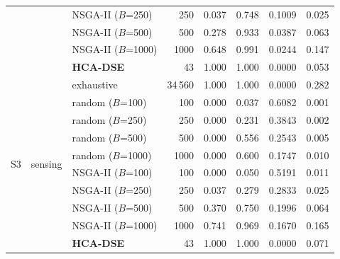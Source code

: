 \begin{tabular}{lllrrrrr}
 & & NSGA-II ($B$=250) & 250 & 0.037 & 0.748 & 0.1009 & 0.025 \\
 & & NSGA-II ($B$=500) & 500 & 0.278 & 0.933 & 0.0387 & 0.063 \\
 & & NSGA-II ($B$=1000) & 1000 & 0.648 & 0.991 & 0.0244 & 0.147 \\
 & & \textbf{HCA-DSE} & 43 & 1.000 & 1.000 & 0.0000 & 0.053 \\
\midrule
\multirow{10}{*}{S3} & \multirow{10}{*}{sensing} & exhaustive & 34\,560 & 1.000 & 1.000 & 0.0000 & 0.282 \\
 & & random ($B$=100) & 100 & 0.000 & 0.037 & 0.6082 & 0.001 \\
 & & random ($B$=250) & 250 & 0.000 & 0.231 & 0.3843 & 0.002 \\
 & & random ($B$=500) & 500 & 0.000 & 0.556 & 0.2543 & 0.005 \\
 & & random ($B$=1000) & 1000 & 0.000 & 0.600 & 0.1747 & 0.010 \\
 & & NSGA-II ($B$=100) & 100 & 0.000 & 0.050 & 0.5191 & 0.011 \\
 & & NSGA-II ($B$=250) & 250 & 0.037 & 0.279 & 0.2833 & 0.025 \\
 & & NSGA-II ($B$=500) & 500 & 0.370 & 0.750 & 0.1996 & 0.064 \\
 & & NSGA-II ($B$=1000) & 1000 & 0.741 & 0.969 & 0.1670 & 0.165 \\
 & & \textbf{HCA-DSE} & 43 & 1.000 & 1.000 & 0.0000 & 0.071 \\
\bottomrule
\end{tabular}
